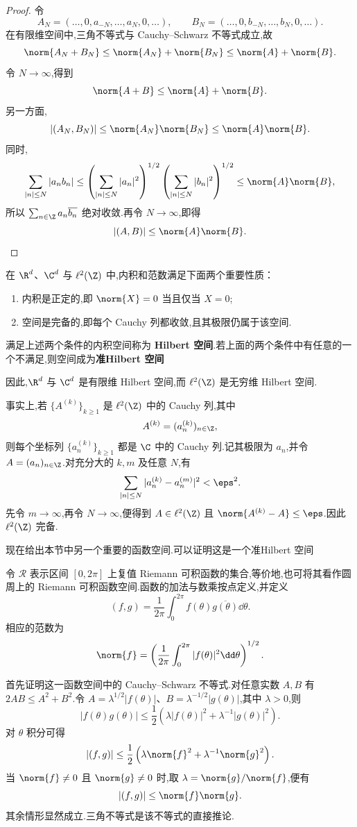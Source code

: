 \begin{proof}
	令
	\[
	A_N=(\ldots,0,a_{-N},\ldots,a_N,0,\ldots),
	\qquad
	B_N=(\ldots,0,b_{-N},\ldots,b_N,0,\ldots).
	\]
	在有限维空间中,三角不等式与 Cauchy--Schwarz 不等式成立,故
	\[
	\norm{A_N+B_N}\leq \norm{A_N}+\norm{B_N}
	\leq \norm{A}+\norm{B}.
	\]
	令 $N\to\infty$,得到
	\[
	\norm{A+B}\leq \norm{A}+\norm{B}.
	\]
	另一方面,
	\[
	|(A_N,B_N)|\leq \norm{A_N}\norm{B_N}
	\leq \norm{A}\norm{B}.
	\]
	同时,
	\[
	\sum_{|n|\leq N}|a_n b_n|
	\leq
	\left(\sum_{|n|\leq N}|a_n|^2\right)^{1/2}
	\left(\sum_{|n|\leq N}|b_n|^2\right)^{1/2}
	\leq \norm{A}\norm{B},
	\]
	所以 $\sum_{n\in\Z}a_n\overline{b_n}$ 绝对收敛.再令 $N\to\infty$,即得
	\[
	|(A,B)|\leq \norm{A}\norm{B}.
	\]
\end{proof}
在 $\R^d$、$\C^d$ 与 $\ell^2(\Z)$ 中,内积和范数满足下面两个重要性质：
\begin{enumerate}
	\item 内积是正定的,即 $\norm{X}=0$ 当且仅当 $X=0$;
	\item 空间是完备的,即每个 Cauchy 列都收敛,且其极限仍属于该空间.
\end{enumerate}
\begin{definition}
	满足上述两个条件的内积空间称为 \textbf{Hilbert 空间}.若上面的两个条件中有任意的一个不满足,则空间成为\textbf{准Hilbert 空间}
\end{definition}
因此,\allowbreak $\R^d$ 与 $\C^d$ 是有限维 Hilbert 空间,而 $\ell^2(\Z)$ 是无穷维 Hilbert 空间.

事实上,若 $\{A^{(k)}\}_{k\geq1}$ 是 $\ell^2(\Z)$ 中的 Cauchy 列,其中
\[
A^{(k)}=(a_n^{(k)})_{n\in\Z},
\]
则每个坐标列 $\{a_n^{(k)}\}_{k\geq1}$ 都是 $\C$ 中的 Cauchy 列.记其极限为 $a_n$,并令 $A=(a_n)_{n\in\Z}$.对充分大的 $k,m$ 及任意 $N$,有
\[
\sum_{|n|\leq N}|a_n^{(k)}-a_n^{(m)}|^2<\eps^2.
\]
先令 $m\to\infty$,再令 $N\to\infty$,便得到 $A\in\ell^2(\Z)$ 且 $\norm{A^{(k)}-A}\leq\eps$.因此 $\ell^2(\Z)$ 完备.

现在给出本节中另一个重要的函数空间.可以证明这是一个准Hilbert 空间


\begin{definition}
	令 $\mathcal R$ 表示区间 $[0,2\pi]$ 上复值 Riemann 可积函数的集合,等价地,也可将其看作圆周上的 Riemann 可积函数空间.函数的加法与数乘按点定义,并定义
	\[
	(f,g)=\frac1{2\pi}\int_0^{2\pi}f(\theta)\overline{g(\theta)}\dd\theta.
	\]
	相应的范数为
	\[
	\norm{f}
	=\left(\frac1{2\pi}\int_0^{2\pi}|f(\theta)|^2\dd\theta\right)^{1/2}.
	\]
\end{definition}

首先证明这一函数空间中的 Cauchy--Schwarz 不等式.对任意实数 $A,B$ 有$2AB\leq A^2+B^2$.令 $A=\lambda^{1/2}|f(\theta)|$、$B=\lambda^{-1/2}|g(\theta)|$,其中 $\lambda>0$,则
\[
|f(\theta)g(\theta)|
\leq \frac12\left(\lambda|f(\theta)|^2+\lambda^{-1}|g(\theta)|^2\right).
\]
对 $\theta$ 积分可得
\[
|(f,g)|
\leq \frac12\left(\lambda\norm{f}^2+\lambda^{-1}\norm{g}^2\right).
\]
当 $\norm{f}\neq0$ 且 $\norm{g}\neq0$ 时,取 $\lambda=\norm{g}/\norm{f}$,便有
\[
|(f,g)|\leq \norm{f}\norm{g}.
\]
其余情形显然成立.三角不等式是该不等式的直接推论.

